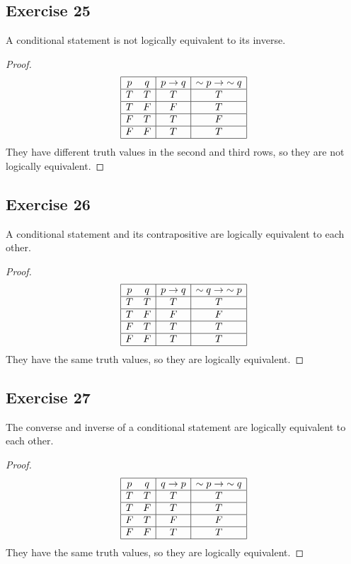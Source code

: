 \documentclass[14pt]{extarticle}
\begin{document}
\subsection{Exercise 25} A conditional statement is not logically equivalent to
its inverse.

\begin{proof} $$ \begin{array}{|cc|c|c|} \hline p & q & p \to q & {\sim p} \to
{\sim q} \\ \hline T & T & T & T \\ \hline T & F & F & T \\ \hline F & T & T & F
\\ \hline F & F & T & T \\ \hline \end{array} $$ They have different truth
values in the second and third rows, so they are not logically equivalent.
\end{proof}

\subsection{Exercise 26} A conditional statement and its contrapositive are
logically equivalent to each other.

\begin{proof} $$ \begin{array}{|cc|c|c|} \hline p & q & p \to q & {\sim q} \to
{\sim p} \\ \hline T & T & T & T \\ \hline T & F & F & F \\ \hline F & T & T & T
\\ \hline F & F & T & T \\ \hline \end{array} $$ They have the same truth
values, so they are logically equivalent. \end{proof}

\subsection{Exercise 27} The converse and inverse of a conditional statement are
logically equivalent to each other.

\begin{proof} $$ \begin{array}{|cc|c|c|} \hline p & q & q \to p & {\sim p} \to
{\sim q} \\ \hline T & T & T & T \\ \hline T & F & T & T \\ \hline F & T & F & F
\\ \hline F & F & T & T \\ \hline \end{array} $$ They have the same truth
values, so they are logically equivalent. \end{proof}
\end{document}
